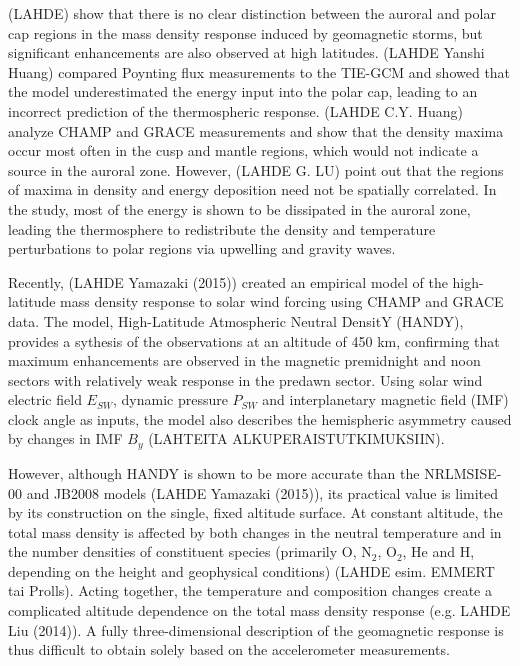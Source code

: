 \documentclass[referee,a4paper,12pt,traditabstract]{swsc}
\begin{document}
\begin{linenumbers}
(LAHDE) show that there is no clear distinction between the auroral and polar cap regions in the mass density response induced by geomagnetic storms, but significant enhancements are also observed at high latitudes. (LAHDE Yanshi Huang) compared Poynting flux measurements to the TIE-GCM and showed that the model underestimated the energy input into the polar cap, leading to an incorrect prediction of the thermospheric response. (LAHDE C.Y. Huang) analyze CHAMP and GRACE measurements and show that the density maxima occur most often in the cusp and mantle regions, which would not indicate a source in the auroral zone. However, (LAHDE G. LU) point out that the regions of maxima in density and energy deposition need not be spatially correlated. In the study, most of the energy is shown to be dissipated in the auroral zone, leading the thermosphere to redistribute the density and temperature perturbations to polar regions via upwelling and gravity waves. 

Recently, (LAHDE Yamazaki (2015)) created an empirical model of the high-latitude mass density response to solar wind forcing using CHAMP and GRACE data. The model, High-Latitude Atmospheric Neutral DensitY (HANDY), provides a sythesis of the observations at an altitude of 450 km, confirming that maximum enhancements are observed in the magnetic premidnight and noon sectors with relatively weak response in the predawn sector. Using solar wind electric field $E_{SW}$, dynamic pressure $P_{SW}$ and interplanetary magnetic field (IMF) clock angle as inputs, the model also describes the hemispheric asymmetry caused by changes in IMF $B_{y}$ (LAHTEITA ALKUPERAISTUTKIMUKSIIN). 

However, although HANDY is shown to be more accurate than the NRLMSISE-00 and JB2008 models (LAHDE Yamazaki (2015)), its practical value is limited by its construction on the single, fixed altitude surface. At constant altitude, the total mass density is affected by both changes in the neutral temperature and in the number densities of constituent species (primarily O, $\mathrm{N_{2}}$, $\mathrm{O_{2}}$, He and H, depending on the height and geophysical conditions) (LAHDE esim. EMMERT tai Prolls). Acting together, the temperature and composition changes create a complicated altitude dependence on the total mass density response (e.g. LAHDE Liu (2014)). A fully three-dimensional description of the geomagnetic response is thus difficult to obtain solely based on the accelerometer measurements.


\end{linenumbers}
\end{document}
